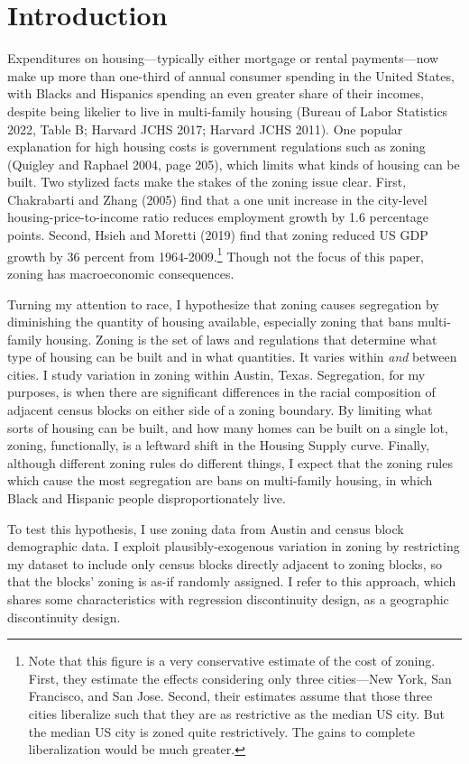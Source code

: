 \documentclass[11pt]{article}
\begin{document}
\section{Introduction}
Expenditures on housing---typically either mortgage or rental payments---now make up more than one-third of annual consumer spending in the United States, with Blacks and Hispanics spending an even greater share of their incomes, despite being likelier to live in multi-family housing (Bureau of Labor Statistics 2022, Table B; Harvard JCHS 2017; Harvard JCHS 2011). One popular explanation for high housing costs is government regulations such as zoning (Quigley and Raphael 2004, page 205), which limits what kinds of housing can be built. Two stylized facts make the stakes of the zoning issue clear. First, Chakrabarti and Zhang (2005) find that a one unit increase in the city-level housing-price-to-income ratio reduces employment growth by 1.6 percentage points. Second, Hsieh and Moretti (2019) find that zoning reduced US GDP growth by 36 percent from 1964-2009.\footnote{Note that this figure is a very conservative estimate of the cost of zoning. First, they estimate the effects considering only three cities---New York, San Francisco, and San Jose. Second, their estimates assume that those three cities liberalize such that they are as restrictive as the median US city. But the median US city is zoned quite restrictively. The gains to complete liberalization would be much greater.} Though not the focus of this paper, zoning has macroeconomic consequences.

Turning my attention to race, I hypothesize that zoning causes segregation by diminishing the quantity of housing available, especially zoning that bans multi-family housing. Zoning is the set of laws and regulations that determine what type of housing can be built and in what quantities. It varies within \textit{and} between cities. I study variation in zoning within Austin, Texas. Segregation, for my purposes, is when there are significant differences in the racial composition of adjacent census blocks on either side of a zoning boundary. By limiting what sorts of housing can be built, and how many homes can be built on a single lot, zoning, functionally, is a leftward shift in the Housing Supply curve. Finally, although different zoning rules do different things, I expect that the zoning rules which cause the most segregation are bans on multi-family housing, in which Black and Hispanic people disproportionately live.

To test this hypothesis, I use zoning data from Austin and census block demographic data. I exploit plausibly-exogenous variation in zoning by restricting my dataset to include only census blocks directly adjacent to zoning blocks, so that the  blocks' zoning is as-if randomly assigned. I refer to this approach, which shares some characteristics with regression discontinuity design, as a geographic discontinuity design.
\end{document}
